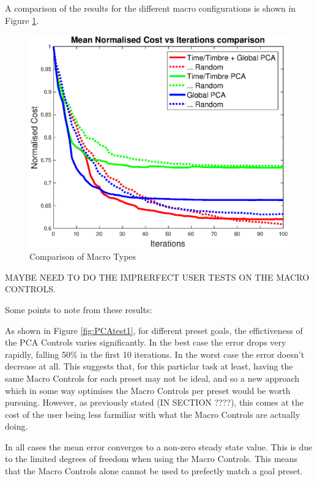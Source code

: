 \documentclass[11pt, oneside]{report}   	%
\begin{document}
A comparison of the results for the different macro configurations is shown in Figure \ref{fig:PCAtest2}.
\begin{figure}
	\centering
	\includegraphics[width = \textwidth]{PCAInterfaceTests2.eps}
	\caption{Comparison of Macro Types}
	\label{fig:PCAtest2}
\end{figure}
MAYBE NEED TO DO THE IMPRERFECT USER TESTS ON THE MACRO CONTROLS.

Some points to note from these results:

As shown in Figure \ref{fig:PCAtest1}, for different preset goals, the effictiveness of the PCA Controls varies significantly. In the best case the error drops very rapidly, falling 50\% in the first 10 iterations. In the worst case the error doesn't decrease at all. This suggests that, for this particlar task at least, having the same Macro Controls for each preset may not be ideal, and so a new approach which in some way optimises the Macro Controls per preset would be worth pursuing. However, as previously stated (IN SECTION ????), this comes at the cost of the user being less farmiliar with what the Macro Controls are actually doing. 

In all cases the mean error converges to a non-zero steady state value. This is due to the limited degrees of freedom when using the Macro Controls. This means that the Macro Controls alone cannot be used to prefectly match a goal preset.
\end{document}
